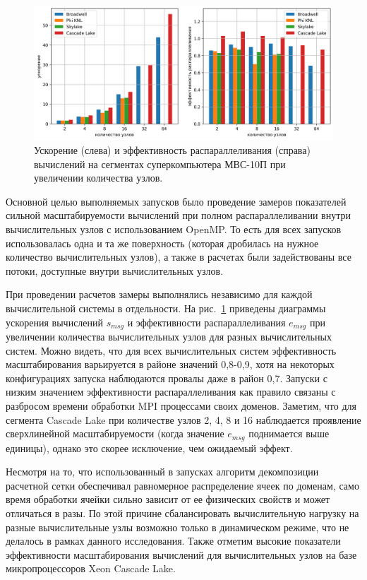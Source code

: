 \begin{figure}[ht]
\centering
\includegraphics[width=1.0\textwidth]{pics/text_2_scaling/2in1.png}
\singlespacing
{}\caption{Ускорение (слева) и эффективность распараллеливания (справа) вычислений на сегментах суперкомпьютера МВС-10П при увеличении количества узлов.}
\label{fig:text_2_scaling_speedup_eff}
\end{figure}

Основной целью выполняемых запусков было проведение замеров показателей сильной масштабируемости вычислений при полном распараллеливании внутри вычислительных узлов с использованием OpenMP\label{abbr:openmp}.
То есть для всех запусков использовалась одна и та же поверхность (которая дробилась на нужное количество вычислительных узлов), а также в расчетах были задействованы все потоки, доступные внутри вычислительных узлов.

При проведении расчетов замеры выполнялись независимо для каждой вычислительной системы в отдельности.
На рис.~\ref{fig:text_2_scaling_speedup_eff} приведены диаграммы ускорения вычислений $s_{msg}$\label{term:msg_speedup2} и эффективности распараллеливания $e_{msg}$\label{term:msg_eff2} при увеличении количества вычислительных узлов для разных вычислительных систем.
Можно видеть, что для всех вычислительных систем эффективность масштабирования варьируется в районе значений 0,8-0,9, хотя на некоторых конфигурациях запуска наблюдаются провалы даже в район 0,7.
Запуски с низким значением эффективности распараллеливания как правило связаны с разбросом времени обработки MPI процессами своих доменов.
Заметим, что для сегмента Cascade Lake при количестве узлов 2, 4, 8 и 16 наблюдается проявление сверхлинейной масштабируемости (когда значение $e_{msg}$ поднимается выше единицы), однако это скорее исключение, чем ожидаемый эффект.

Несмотря на то, что использованный в запусках алгоритм декомпозиции расчетной сетки обеспечивал равномерное распределение ячеек по доменам, само время обработки ячейки сильно зависит от ее физических свойств и может отличаться в разы.
По этой причине сбалансировать вычислительную нагрузку на разные вычислительные узлы возможно только в динамическом режиме, что не делалось в рамках данного исследования.
Также отметим высокие показатели эффективности масштабирования вычислений для вычислительных узлов на базе микропроцессоров Xeon Cascade Lake.

